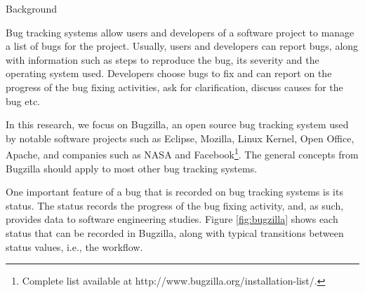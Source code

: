 \begin{section}{Background}


Bug tracking systems allow users and developers of a software project to manage a list of bugs for the project. Usually, users and developers can report bugs, along with information such as steps to reproduce the bug, its severity and the operating system used. Developers choose bugs to fix and can report on the progress of the bug fixing activities, ask for clarification, discuss causes for the bug etc.

In this research, we focus on Bugzilla, an open source bug tracking system used by notable software projects such as Eclipse, Mozilla, Linux Kernel, Open Office, Apache, and companies such as NASA and Facebook\footnote{Complete list available at http://www.bugzilla.org/installation-list/.}. The general concepts from Bugzilla should apply to most other bug tracking systems.

One important feature of a bug that is recorded on bug tracking systems is its status. The status records the progress of the bug fixing activity, and, as such, provides data to software engineering studies. Figure \ref{fig:bugzilla} shows each status that can be recorded in Bugzilla, along with typical transitions between status values, i.e., the workflow.


\end{section}
